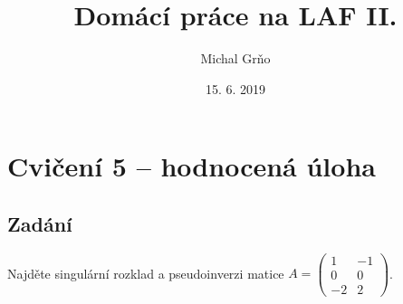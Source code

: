 \documentclass[]{article}
\title{Domácí práce na LAF II.}
\date{15. 6. 2019}
\author{Michal Grňo}
\newcommand{\mat}[1]{\begin{pmatrix}#1\end{pmatrix}}
\begin{document}
\maketitle

\begingroup
\addtolength{\jot}{1em}


\section{Cvičení 5 – hodnocená úloha}
\subsection{Zadání}
Najděte singulární rozklad a pseudoinverzi matice $A = \mat{1&-1\\0&0\\-2&2}$.
\end{document}
